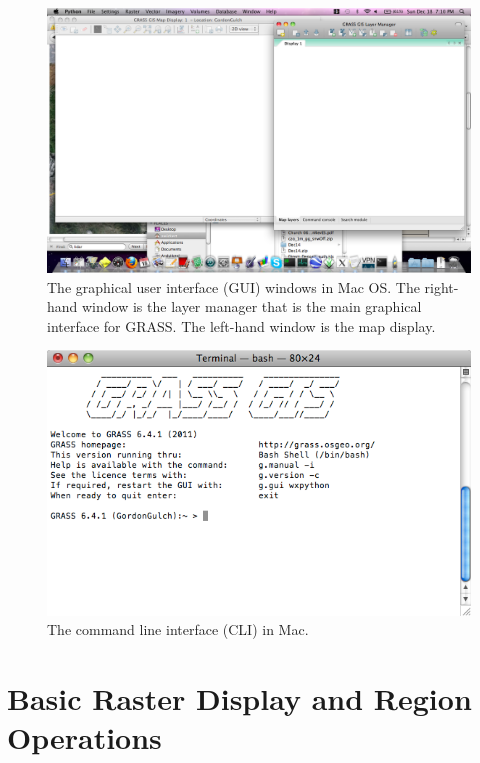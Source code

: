\documentclass{book}
\begin{document}
\begin{figure}[h]
 \begin{center}
 \includegraphics[width=.9\linewidth]{figures/mac/GUI.png}
 \caption{The graphical user interface (GUI) windows in Mac OS. The right-hand window is the layer manager that is the main graphical interface for GRASS. The left-hand window is the map display.}
 \label{fig:GUI}
 \end{center}
\end{figure}

\begin{figure}[h]
 \begin{center}
 \includegraphics[width=.9\linewidth]{figures/mac/macCLI.png}
 \caption{The command line interface (CLI) in Mac.}
 \label{fig:macCLI}
 \end{center}
\end{figure}


\chapter{Basic Raster Display and Region Operations}
\end{document}

